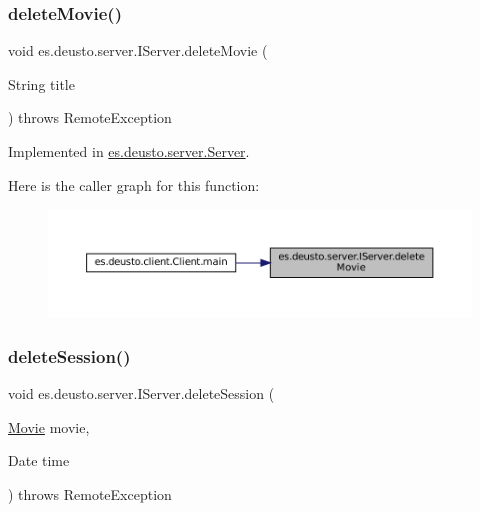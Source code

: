 \subsubsection{\texorpdfstring{deleteMovie()}{deleteMovie()}}
{\footnotesize\ttfamily void es.\+deusto.\+server.\+I\+Server.\+delete\+Movie (\begin{DoxyParamCaption}\item[{String}]{title }\end{DoxyParamCaption}) throws Remote\+Exception}



Implemented in \mbox{\hyperlink{classes_1_1deusto_1_1server_1_1_server_a6501e4103fcc2ef691c15e4e02f7136c}{es.\+deusto.\+server.\+Server}}.

Here is the caller graph for this function\+:
\nopagebreak
\begin{figure}[H]
\begin{center}
\leavevmode
\includegraphics[width=350pt]{interfacees_1_1deusto_1_1server_1_1_i_server_a0b3243dc04d49f7659fefec4e4fb43b7_icgraph}
\end{center}
\end{figure}
\mbox{\label{interfacees_1_1deusto_1_1server_1_1_i_server_a83edabd700f0b02d4007c28392ec7c94}} 
\subsubsection{\texorpdfstring{deleteSession()}{deleteSession()}}
{\footnotesize\ttfamily void es.\+deusto.\+server.\+I\+Server.\+delete\+Session (\begin{DoxyParamCaption}\item[{\mbox{\hyperlink{classes_1_1deusto_1_1server_1_1jdo_1_1_movie}{Movie}}}]{movie,  }\item[{Date}]{time }\end{DoxyParamCaption}) throws Remote\+Exception}



